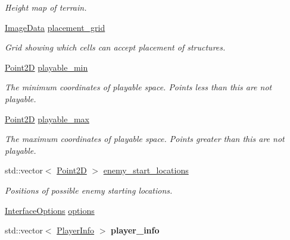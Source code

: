 \begin{DoxyCompactItemize}
\begin{DoxyCompactList}\small\item\em Height map of terrain. \end{DoxyCompactList}\item 
\mbox{\label{structsc2_1_1_game_info_a97b2e1a0e7b22105d52dd7761b16111f}} 
\hyperlink{structsc2_1_1_image_data}{Image\+Data} \hyperlink{structsc2_1_1_game_info_a97b2e1a0e7b22105d52dd7761b16111f}{placement\+\_\+grid}
\begin{DoxyCompactList}\small\item\em Grid showing which cells can accept placement of structures. \end{DoxyCompactList}\item 
\mbox{\label{structsc2_1_1_game_info_acf482bed6694db9ce4b7da0e139eac57}} 
\hyperlink{structsc2_1_1_point2_d}{Point2D} \hyperlink{structsc2_1_1_game_info_acf482bed6694db9ce4b7da0e139eac57}{playable\+\_\+min}
\begin{DoxyCompactList}\small\item\em The minimum coordinates of playable space. Points less than this are not playable. \end{DoxyCompactList}\item 
\mbox{\label{structsc2_1_1_game_info_a5b6d4abc12023b79a197ca3071ee79c8}} 
\hyperlink{structsc2_1_1_point2_d}{Point2D} \hyperlink{structsc2_1_1_game_info_a5b6d4abc12023b79a197ca3071ee79c8}{playable\+\_\+max}
\begin{DoxyCompactList}\small\item\em The maximum coordinates of playable space. Points greater than this are not playable. \end{DoxyCompactList}\item 
\mbox{\label{structsc2_1_1_game_info_a5b39c34817d8dd67e930d7628d9c32c1}} 
std\+::vector$<$ \hyperlink{structsc2_1_1_point2_d}{Point2D} $>$ \hyperlink{structsc2_1_1_game_info_a5b39c34817d8dd67e930d7628d9c32c1}{enemy\+\_\+start\+\_\+locations}
\begin{DoxyCompactList}\small\item\em Positions of possible enemy starting locations. \end{DoxyCompactList}\item 
\hyperlink{structsc2_1_1_interface_options}{Interface\+Options} \hyperlink{structsc2_1_1_game_info_a44cd71a765e383ef257e75ead9839d1c}{options}
\item 
\mbox{\label{structsc2_1_1_game_info_ae7a02d8615163e50336d511bb9fd300c}} 
std\+::vector$<$ \hyperlink{structsc2_1_1_player_info}{Player\+Info} $>$ {\bfseries player\+\_\+info}
\end{DoxyCompactItemize}


